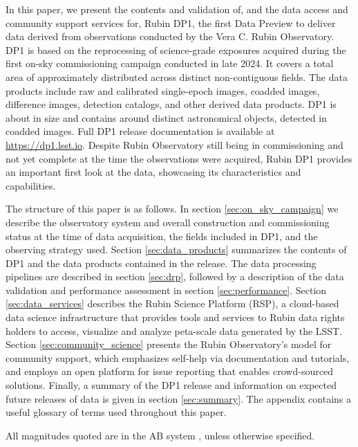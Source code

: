 In this paper, we present the contents and validation of, and the data access and community support services for, Rubin \gls{DP1}, the first Data Preview to deliver data derived from observations conducted by the Vera C. Rubin Observatory.
\gls{DP1} is based on the reprocessing of \nexposures science-grade exposures acquired 
during the first on-sky commissioning campaign conducted in late 2024.
It covers a  total area of approximately \totalarea distributed across \nfields distinct non-contiguous fields.
The data products include raw and calibrated single-\gls{epoch} images, coadded images, difference images, detection catalogs, and other derived data products.
\gls{DP1} is about \sizeinbytes in size and contains around \nobjects distinct astronomical objects, detected in \ndeepcoadds coadded images.
Full \gls{DP1} release documentation is available at \url{https://dp1.lsst.io}.
Despite Rubin Observatory still being in commissioning and not yet complete at the time the observations were acquired, Rubin \gls{DP1} provides an important first look at the data, showcasing its characteristics and capabilities.

The structure of this paper is as follows.
In section \ref{sec:on_sky_campaign} we describe the observatory system and overall construction and commissioning status at the time of data acquisition, the \nfields fields included in \gls{DP1}, and the observing strategy used.
Section \ref{sec:data_products} summarizes the contents of \gls{DP1} and the data products contained in the release.
The data processing pipelines are described in section \ref{sec:drp}, followed by a description of the data validation and performance assessment in section \ref{sec:performance}.
Section \ref{sec:data_services} describes the Rubin \gls{Science Platform} (RSP), a \gls{cloud}-based data science infrastructure that provides tools and services to Rubin data rights holders to access, visualize and analyze peta-scale data generated by the \gls{LSST}.
Section \ref{sec:community_science} presents the Rubin Observatory's model for community support, which emphasizes self-help via documentation and tutorials, and employs an open platform for issue reporting that enables crowd-sourced solutions.
Finally, a summary of the \gls{DP1} release and information on expected future releases of data is given in section \ref{sec:summary}.
The appendix contains a useful glossary of terms used throughout this paper.

All magnitudes quoted are in the AB system \citep{1983ApJ...266..713O}, unless otherwise specified.